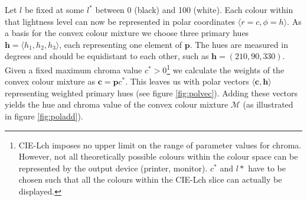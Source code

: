\documentclass[parskip=half]{scrartcl}
\begin{document}
\begin{appendix}
Let $l$ be fixed at some $l^*$ between 0 (black) and 100 (white). Each colour within that lightness level can now be represented in polar coordinates $\langle r = c, \phi = h \rangle$. As a basis for the convex colour mixture we choose three primary hues $\textbf{h} = \langle h_1, h_2, h_3 \rangle$, each representing one element of $\textbf{p}$. The hues are measured in degrees and should be equidistant to each other, such as $\textbf{h}=(210, 90, 330)$. Given a fixed maximum chroma value $c^* > 0$\footnote{
  CIE-Lch imposes no upper limit on the range of parameter values for chroma. However, not all theoretically possible colours within the colour space can be represented by the output device (printer, monitor). $c^*$ and $l*$ have to be chosen such that all the colours within the CIE-Lch slice can actually be displayed.
}
we calculate the weights of the convex colour mixture as $\textbf{c}=\textbf{p}c^*$. This leaves us with polar vectors $\langle \textbf{c}, \textbf{h} \rangle$ representing weighted primary hues (see figure \ref{fig:polvec}). Adding these vectors yields the hue and chroma value of the convex colour mixture $\mathscr{M}$ (as illustrated in figure \ref{fig:poladd}).


\end{appendix}
\end{document}
